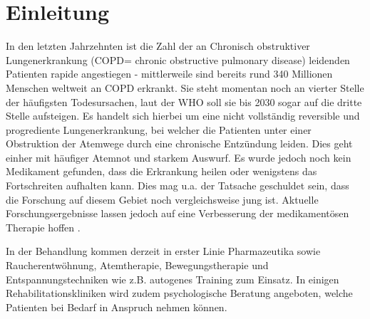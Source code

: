\chapter{Einleitung}
\label{einleitung}
\ifpdf
    \graphicspath{{1_introduction/figures/PNG/}{1_einleitung/figures/PDF/}{1_einleitung/figures/}}
\else
    \graphicspath{{1_einleitung/figures/EPS/}{1_einleitung/figures/}}
\fi

In den letzten Jahrzehnten ist die Zahl der an Chronisch obstruktiver Lungenerkrankung (COPD= chronic obstructive pulmonary disease) leidenden Patienten rapide angestiegen - mittlerweile sind bereits rund 340 Millionen Menschen weltweit an COPD erkrankt. Sie steht momentan noch an vierter Stelle der häufigsten Todesursachen, laut der WHO soll sie bis 2030 sogar auf die dritte Stelle aufsteigen. Es handelt sich hierbei um eine nicht vollständig reversible und progrediente Lungenerkrankung, bei welcher die Patienten unter einer Obstruktion der Atemwege durch eine chronische Entzündung leiden. Dies geht einher mit häufiger Atemnot und starkem Auswurf.
Es wurde jedoch noch kein Medikament gefunden, dass die Erkrankung heilen oder wenigstens das Fortschreiten aufhalten kann. Dies mag u.a. der Tatsache geschuldet sein, dass die Forschung auf diesem Gebiet noch vergleichsweise jung ist. Aktuelle Forschungsergebnisse lassen jedoch auf eine Verbesserung der medikamentösen Therapie hoffen \autocite[vgl.]{doccheck2014}.

In der Behandlung kommen derzeit in erster Linie Pharmazeutika sowie Raucherentwöhnung, Atemtherapie, Bewegungstherapie und Entspannungstechniken wie z.B. autogenes Training zum Einsatz. In einigen Rehabilitationskliniken wird zudem psychologische Beratung angeboten, welche Patienten bei Bedarf in Anspruch nehmen können.

